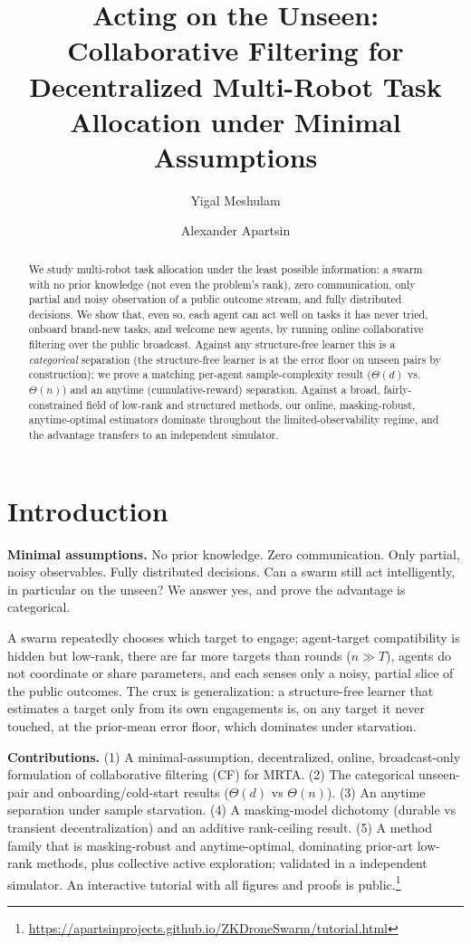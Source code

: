 \documentclass[11pt]{article}
\title{Acting on the Unseen: Collaborative Filtering for Decentralized
Multi-Robot Task Allocation under Minimal Assumptions}
\author{Yigal Meshulam \and Alexander Apartsin}
\date{}
\theoremstyle{plain}
\begin{document}
\maketitle

\begin{abstract}
We study multi-robot task allocation under the least possible information: a swarm
with no prior knowledge (not even the problem's rank), zero communication, only
partial and noisy observation of a public outcome stream, and fully distributed
decisions. We show that, even so, each agent can act well on tasks it has never
tried, onboard brand-new tasks, and welcome new agents, by running online
collaborative filtering over the public broadcast. Against any structure-free
learner this is a \emph{categorical} separation (the structure-free learner is at
the error floor on unseen pairs by construction); we prove a matching per-agent
sample-complexity result ($\Theta(d)$ vs.\ $\Theta(n)$) and an anytime
(cumulative-reward) separation. Against a broad, fairly-constrained field of
low-rank and structured methods, our online, masking-robust, anytime-optimal
estimators dominate throughout the limited-observability regime, and the advantage
transfers to an independent simulator.
\end{abstract}

\section{Introduction}
\textbf{Minimal assumptions.} No prior knowledge. Zero communication. Only partial,
noisy observables. Fully distributed decisions. Can a swarm still act intelligently,
in particular on the unseen? We answer yes, and prove the advantage is categorical.

A swarm repeatedly chooses which target to engage; agent-target compatibility is
hidden but low-rank, there are far more targets than rounds ($n \gg T$), agents do
not coordinate or share parameters, and each senses only a noisy, partial slice of
the public outcomes. The crux is generalization: a structure-free learner that
estimates a target only from its own engagements is, on any target it never touched,
at the prior-mean error floor, which dominates under starvation.

\textbf{Contributions.} (1) A minimal-assumption, decentralized, online,
broadcast-only formulation of collaborative filtering (CF) for MRTA. (2) The
categorical unseen-pair and onboarding/cold-start results ($\Theta(d)$ vs
$\Theta(n)$). (3) An anytime separation under sample starvation. (4) A masking-model
dichotomy (durable vs transient decentralization) and an additive rank-ceiling
result. (5) A method family that is masking-robust and anytime-optimal, dominating
prior-art low-rank methods, plus collective active exploration; validated in a
independent simulator. An interactive tutorial with all figures and proofs is
public.\footnote{\url{https://apartsinprojects.github.io/ZKDroneSwarm/tutorial.html}}
\end{document}
